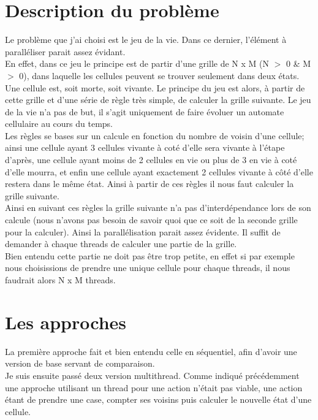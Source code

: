 \documentclass[10pt,a4paper]{article}
\begin{document}
\section{Description du problème}

\indent Le problème que j'ai choisi est le jeu de la vie. Dans ce dernier, l'élément à paralléliser parait assez évidant. \\
En effet, dans ce jeu le principe est de partir d'une grille de N x M (N $>$ 0 \& M $>$ 0), dans laquelle les cellules peuvent se trouver seulement dans deux états. Une cellule est, soit morte, soit vivante. 
Le principe du jeu est alors, à partir de cette grille et d'une série de règle très simple, de calculer la grille suivante. 
Le jeu de la vie n'a pas de but, il s'agit uniquement de faire évoluer un automate cellulaire au cours du temps.\\

Les règles se bases sur un calcule en fonction du nombre de voisin d'une cellule; ainsi une cellule ayant 3 cellules vivante à coté d'elle sera vivante à l'étape d'après, une cellule ayant moins de 2 cellules en vie ou plus de 3 en vie à coté d'elle mourra, et enfin une cellule ayant exactement 2 cellules vivante à côté d'elle restera dans le même état. Ainsi à partir de ces règles il nous faut calculer la grille suivante. \\

Ainsi en suivant ces règles la grille suivante n'a pas d'interdépendance lors de son calcule (nous n'avons pas besoin de savoir quoi que ce soit de la seconde grille pour la calculer). Ainsi la parallélisation parait assez évidente. Il suffit de demander à chaque threads de calculer une partie de la grille. \\
Bien entendu cette partie ne doit pas être trop petite, en effet si par exemple nous choisissions de prendre une unique cellule pour chaque threads, il nous faudrait alors N x M threads.

\section{Les approches}
La première approche fait et bien entendu celle en séquentiel, afin d'avoir une version de base servant de comparaison. \\

Je suis ensuite passé deux version multithread. Comme indiqué précédemment une approche utilisant un thread pour une action n'était pas viable, une action étant de prendre une case, compter ses voisins puis calculer le nouvelle état d'une cellule. \\
\end{document}
